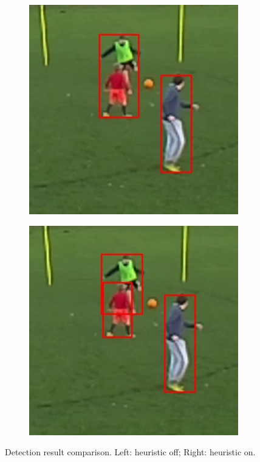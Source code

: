 \documentclass{article}
\begin{document}
\begin{figure}[h!]
\begin{subfigure}[b]{0.5\linewidth}
	\includegraphics[scale=0.4]{report/pic/3_new/off_3.jpg} 
  \end{subfigure}
  \begin{subfigure}[b]{0.5\linewidth}
  \centering
	\includegraphics[scale=0.4]{report/pic/3_new/on_3.jpg} 
  \end{subfigure}
  \caption{Detection result comparison. Left: heuristic off; Right: heuristic on.}
\end{figure}
\end{document}
